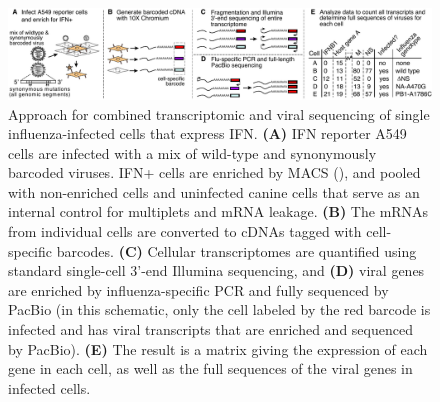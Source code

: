 \documentclass[9pt,lineno]{template}
\begin{document}
\begin{figure}
\begin{fullwidth}

\includegraphics[width=\linewidth, valign=t]{figures/WorkflowSchematic/SchematicForPaper.pdf}

\caption{
Approach for combined transcriptomic and viral sequencing of single influenza-infected cells that express IFN.
{\bf (A)}
IFN reporter A549 cells are infected with a mix of wild-type and synonymously barcoded viruses.
IFN+ cells are enriched by MACS (), and pooled with non-enriched cells and uninfected canine cells that serve as an internal control for multiplets and mRNA leakage.
{\bf (B)}
The mRNAs from individual cells are converted to cDNAs tagged with cell-specific barcodes.
{\bf (C)}
Cellular transcriptomes are quantified using standard single-cell 3'-end Illumina sequencing, and 
{\bf (D)}
viral genes are enriched by influenza-specific PCR and fully sequenced by PacBio (in this schematic, only the cell labeled by the red barcode is infected and has viral transcripts that are enriched and sequenced by PacBio).
{\bf (E)}
The result is a matrix giving the expression of each gene in each cell, as well as the full sequences of the viral genes in infected cells.
}
\label{fig:workflow}


\end{fullwidth}
\end{figure}
\end{document}
